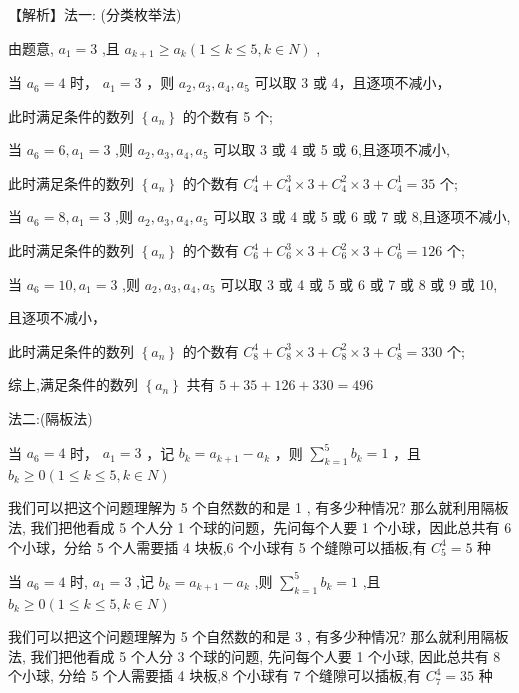 \documentclass[10pt]{article}
\begin{document}
【解析】法一: (分类枚举法)

由题意, \({a}_{1} = 3\) ,且 \({a}_{k + 1} \geq  {a}_{k}\left( {1 \leq  k \leq  5,k \in  N}\right)\) ,

当 \({a}_{6} = 4\) 时， \({a}_{1} = 3\) ，则 \({a}_{2},{a}_{3},{a}_{4},{a}_{5}\) 可以取 3 或 4，且逐项不减小，

此时满足条件的数列 \(\left\{  {a}_{n}\right\}\) 的个数有 5 个;

当 \({a}_{6} = 6,{a}_{1} = 3\) ,则 \({a}_{2},{a}_{3},{a}_{4},{a}_{5}\) 可以取 3 或 4 或 5 或 6,且逐项不减小,

此时满足条件的数列 \(\left\{  {a}_{n}\right\}\) 的个数有 \({C}_{4}^{4} + {C}_{4}^{3} \times  3 + {C}_{4}^{2} \times  3 + {C}_{4}^{1} = {35}\) 个;

当 \({a}_{6} = 8,{a}_{1} = 3\) ,则 \({a}_{2},{a}_{3},{a}_{4},{a}_{5}\) 可以取 3 或 4 或 5 或 6 或 7 或 8,且逐项不减小,

此时满足条件的数列 \(\left\{  {a}_{n}\right\}\) 的个数有 \({C}_{6}^{4} + {C}_{6}^{3} \times  3 + {C}_{6}^{2} \times  3 + {C}_{6}^{1} = {126}\) 个;

当 \({a}_{6} = {10},{a}_{1} = 3\) ,则 \({a}_{2},{a}_{3},{a}_{4},{a}_{5}\) 可以取 3 或 4 或 5 或 6 或 7 或 8 或 9 或 10,

且逐项不减小，

此时满足条件的数列 \(\left\{  {a}_{n}\right\}\) 的个数有 \({C}_{8}^{4} + {C}_{8}^{3} \times  3 + {C}_{8}^{2} \times  3 + {C}_{8}^{1} = {330}\) 个;

综上,满足条件的数列 \(\left\{  {a}_{n}\right\}\) 共有 \(5 + {35} + {126} + {330} = {496}\)

法二:(隔板法)

当 \({a}_{6} = 4\) 时， \({a}_{1} = 3\) ，记 \({b}_{k} = {a}_{k + 1} - {a}_{k}\) ，则 \(\mathop{\sum }\limits_{{k = 1}}^{5}{b}_{k} = 1\) ，且 \({b}_{k} \geq  0\left( {1 \leq  k \leq  5,k \in  N}\right)\)

我们可以把这个问题理解为 5 个自然数的和是 1 , 有多少种情况? 那么就利用隔板法, 我们把他看成 5 个人分 1 个球的问题，先问每个人要 1 个小球，因此总共有 6 个小球，分给 5 个人需要插 4 块板,6 个小球有 5 个缝隙可以插板,有 \({C}_{5}^{4} = 5\) 种

当 \({a}_{6} = 4\) 时, \({a}_{1} = 3\) ,记 \({b}_{k} = {a}_{k + 1} - {a}_{k}\) ,则 \(\mathop{\sum }\limits_{{k = 1}}^{5}{b}_{k} = 1\) ,且 \({b}_{k} \geq  0\left( {1 \leq  k \leq  5,k \in  N}\right)\)

我们可以把这个问题理解为 5 个自然数的和是 3 , 有多少种情况? 那么就利用隔板法, 我们把他看成 5 个人分 3 个球的问题, 先问每个人要 1 个小球, 因此总共有 8 个小球, 分给 5 个人需要插 4 块板,8 个小球有 7 个缝隙可以插板,有 \({C}_{7}^{4} = {35}\) 种
\end{document}
